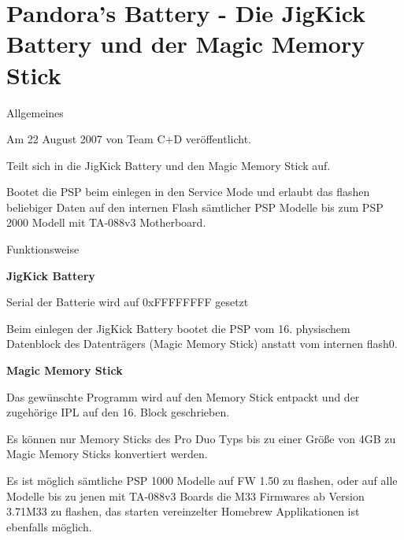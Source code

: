 \documentclass[mode=print,paper=screen,size=10pt,style=paintings]{powerdot}
\begin{document}
\section{Pandora's Battery - Die JigKick Battery und der Magic Memory Stick}
\begin{slide}{Allgemeines}
	\begin{list}{-}{}
		\item{Am 22 August 2007 von Team C+D veröffentlicht.}
		\item{Teilt sich in die JigKick Battery und den Magic Memory Stick auf.}
		\item{Bootet die PSP beim einlegen in den Service Mode und erlaubt das flashen beliebiger Daten auf den internen Flash
			sämtlicher PSP Modelle bis zum PSP 2000 Modell mit TA-088v3 Motherboard.}
	\end{list}
\end{slide}

\begin{slide}{Funktionsweise}
	\begin{large}\textbf{JigKick Battery}\end{large}
	\begin{list}{-}{}
		\item{Serial der Batterie wird auf 0xFFFFFFFF gesetzt}
		\item{Beim einlegen der JigKick Battery bootet die PSP vom 16. physischem Datenblock des Datenträgers
			(Magic Memory Stick) anstatt vom internen flash0.}
	\end{list}
	\begin{large}\textbf{Magic Memory Stick}\end{large}
	\begin{list}{-}{}
		\item{Das gewünschte Programm wird auf den Memory Stick entpackt und der zugehörige IPL auf den 16. Block geschrieben.}
		\item{Es können nur Memory Sticks des Pro Duo Typs bis zu einer Größe von 4GB zu Magic Memory Sticks konvertiert
			werden.}
		\item{Es ist möglich sämtliche PSP 1000 Modelle auf FW 1.50 zu flashen, oder auf alle Modelle bis zu jenen mit TA-088v3
			Boards die M33 Firmwares ab Version 3.71M33 zu flashen, das starten vereinzelter Homebrew Applikationen ist
			ebenfalls möglich.}
	\end{list}
\end{slide}
\end{document}
